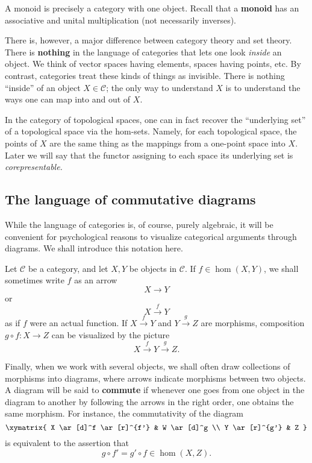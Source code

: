 \begin{example}
A monoid is precisely a category with one object. Recall that a \textbf{monoid}
has an associative and unital multiplication (not necessarily inverses).
\end{example}

There is, however, a major difference between category theory and set theory.
There is \textbf{nothing} in the language of categories that lets one look
\emph{inside} an object. We think of vector spaces having elements, spaces
having points, etc.
By contrast, categories treat these kinds of things as invisible. There
is nothing ``inside'' of an object $X \in \mathcal{C}$; the only way to
understand $X$ is
to understand the ways one can map into and out of $X$.

\begin{example}
In the category of topological spaces, one can in fact recover the
``underlying set'' of a topological space via the hom-sets. Namely, for each
topological space, the points of $X$ are the same thing as the mappings from a
one-point space into $X$. Later we will say that the functor assigning to each
space its underlying set is \emph{corepresentable.}
\end{example}

\subsection{The language of commutative diagrams}

While the language of categories is, of course, purely algebraic, it will be
convenient for psychological reasons to visualize categorical arguments
through diagrams.
We shall introduce this notation here.

Let $\mathcal{C}$ be a category, and let $X, Y$ be objects in $\mathcal{C}$.
If $f \in \hom(X, Y)$, we shall sometimes write $f$ as an arrow
\[ X \to Y  \]
or
\[ X \stackrel{f}{\to} Y \]
as if $f$ were an actual function.
If $X \stackrel{f}{\to} Y$ and $Y \stackrel{g}{\to} Z$ are morphisms,
composition $g \circ f: X \to Z$ can be visualized by the picture
\[ X \stackrel{f}{\to} Y \stackrel{g}{\to} Z.\]

Finally, when we work with several objects, we shall often draw collections of
morphisms into diagrams, where arrows indicate morphisms between two objects.
A diagram will be said to \textbf{commute} if whenever one goes from one
object in the diagram to another by following the arrows in the right order,
one obtains the same morphism.
For instance, the commutativity of the diagram
\[ \xymatrix{
X \ar[d]^f \ar[r]^{f'} &  W \ar[d]^g \\
Y \ar[r]^{g'} &  Z
}\]
is equivalent to the assertion that
\[ g \circ f' = g' \circ f \in \hom(X, Z).  \]


